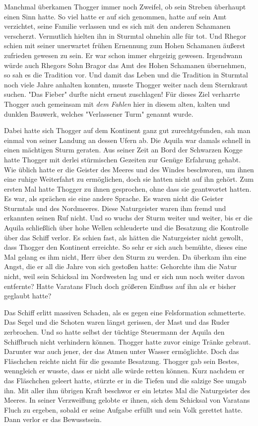 \documentclass[10pt, a4paper, oneside]{book}
\begin{document}
\begin{multicols}{2}
Manchmal überkamen Thogger immer noch Zweifel, ob sein Streben überhaupt einen Sinn hatte. So viel hatte er auf sich genommen, hatte auf sein Amt verzichtet, seine Familie verlassen und es sich mit den anderen Schamanen verscherzt. Vermutlich hielten ihn in Sturmtal ohnehin alle für tot. Und Rhegor schien mit seiner unerwartet frühen Ernennung zum Hohen Schamanen äußerst zufrieden gewesen zu sein. Er war schon immer ehrgeizig gewesen. Irgendwann würde auch Rhegors Sohn Bragor das Amt des Hohen Schamanen übernehmen, so sah es die Tradition vor. Und damit das Leben und die Tradition in Sturmtal noch viele Jahre anhalten konnten, musste Thogger weiter nach dem Sternkraut suchen. "Das Fieber" durfte nicht erneut zuschlagen! Für dieses Ziel verharrte Thogger auch gemeinsam mit \textit{dem Fahlen} hier in diesem alten, kalten und dunklen Bauwerk, welches "Verlassener Turm" genannt wurde.\bigskip

Dabei hatte sich Thogger auf dem Kontinent ganz gut zurechtgefunden, sah man einmal von seiner Landung an dessen Ufern ab. Die Aquila war damals schnell in einen mächtigen Sturm geraten. Aus seiner Zeit an Bord der Schwarzen Kogge hatte Thogger mit derlei stürmischen Gezeiten zur Genüge Erfahrung gehabt. Wie üblich hatte er die Geister des Meeres und des Windes beschworen, um ihnen eine ruhige Weiterfahrt zu ermöglichen, doch sie hatten nicht auf ihn gehört. Zum ersten Mal hatte Thogger zu ihnen gesprochen, ohne dass sie geantwortet hatten. Es war, als sprächen sie eine andere Sprache. Es waren nicht die Geister Sturmtals und des Nordmeeres. Diese Naturgeister waren ihm fremd und erkannten seinen Ruf nicht. Und so wuchs der Sturm weiter und weiter, bis er die Aquila schließlich über hohe Wellen schleuderte und die Besatzung die Kontrolle über das Schiff verlor. Es schien fast, als hätten die Naturgeister nicht gewollt, dass Thogger den Kontinent erreichte. So sehr er sich auch bemühte, dieses eine Mal gelang es ihm nicht, Herr über den Sturm zu werden. Da überkam ihn eine Angst, die er all die Jahre von sich gestoßen hatte: Gehorchte ihm die Natur nicht, weil sein Schicksal im Nordwesten lag und er sich nun noch weiter davon entfernte? Hatte Varatans Fluch doch größeren Einfluss auf ihn als er bisher geglaubt hatte?\bigskip

Das Schiff erlitt massiven Schaden, als es gegen eine Felsformation schmetterte. Das Segel und die Schoten waren längst gerissen, der Mast und das Ruder zerbrochen. Und so hatte selbst der tüchtige Steuermann der Aquila den Schiffbruch nicht verhindern können. Thogger hatte zuvor einige Tränke gebraut. Darunter war auch jener, der das Atmen unter Wasser ermöglichte. Doch das Fläschchen reichte nicht für die gesamte Besatzung. Thogger gab sein Bestes, wenngleich er wusste, dass er nicht alle würde retten können. Kurz nachdem er das Fläschchen geleert hatte, stürzte er in die Tiefen und die salzige See umgab ihn. Mit aller ihm übrigen Kraft beschwor er ein letztes Mal die Naturgeister des Meeres. In seiner Verzweiflung gelobte er ihnen, sich dem Schicksal von Varatans Fluch zu ergeben, sobald er seine Aufgabe erfüllt und sein Volk gerettet hatte. Dann verlor er das Bewusstsein.\bigskip
 

\end{multicols}
\end{document}
